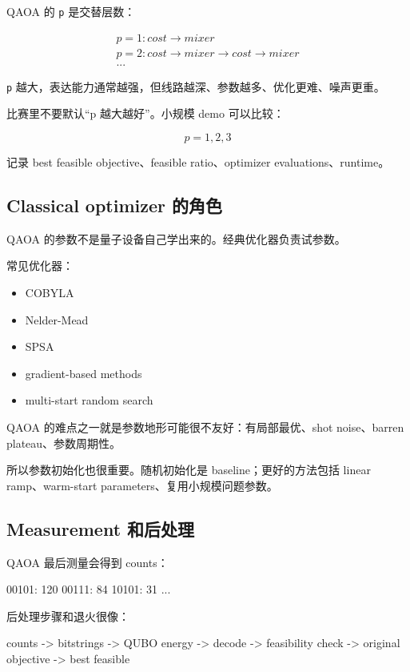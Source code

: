 \documentclass[UTF8,12pt,a4paper]{ctexart}
\begin{document}
QAOA 的 \texttt{p} 是交替层数：

\[
\begin{aligned}
p = 1: cost \to mixer\\
p = 2: cost \to mixer \to cost \to mixer\\
...
\end{aligned}
\]

\texttt{p} 越大，表达能力通常越强，但线路越深、参数越多、优化更难、噪声更重。

比赛里不要默认“p 越大越好”。小规模 demo 可以比较：

\[
p = 1, 2, 3
\]

记录 best feasible objective、feasible ratio、optimizer evaluations、runtime。

\subsection*{Classical optimizer 的角色}

QAOA 的参数不是量子设备自己学出来的。经典优化器负责试参数。

常见优化器：

\begin{itemize}
\item COBYLA
\item Nelder-Mead
\item SPSA
\item gradient-based methods
\item multi-start random search
\end{itemize}

QAOA 的难点之一就是参数地形可能很不友好：有局部最优、shot noise、barren plateau、参数周期性。

所以参数初始化也很重要。随机初始化是 baseline；更好的方法包括 linear ramp、warm-start parameters、复用小规模问题参数。

\subsection*{Measurement 和后处理}

QAOA 最后测量会得到 counts：

\begin{GuideVerbatim}
00101: 120
00111: 84
10101: 31
...
\end{GuideVerbatim}

后处理步骤和退火很像：

\begin{GuideVerbatim}
counts
  -> bitstrings
  -> QUBO energy
  -> decode
  -> feasibility check
  -> original objective
  -> best feasible
\end{GuideVerbatim}
\end{document}
